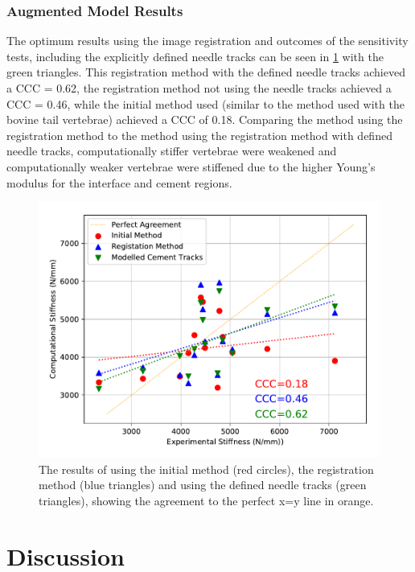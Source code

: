 \subsubsection{Augmented Model Results}\label{sec:augcompres}

The optimum results using the image registration and outcomes of the
sensitivity tests, including the explicitly defined needle tracks can be seen
in \cref{fig:aug_init_vs_best} with the green triangles.  This registration
method with the defined needle tracks achieved a CCC = 0.62, the registration
method not using the needle tracks achieved a CCC = 0.46, while the initial
method used (similar to the method used with the bovine tail vertebrae)
achieved a CCC of 0.18. Comparing the method using the registration method to
the method using the registration method with defined needle tracks,
computationally stiffer vertebrae were weakened and computationally weaker
vertebrae were stiffened due to the higher Young's modulus for the interface
and cement regions.

\begin{figure}[h!]
  \centering
	\includegraphics[width=\textwidth]{Chapters/Chapter_HT_images/aug_init_vs_best_vs_ndl_trcks}
	\caption{The results of using the initial method (red circles), the
registration method (blue triangles) and using the defined needle tracks (green
triangles), showing the agreement to the perfect x=y line in orange.}
	\label{fig:aug_init_vs_best}
\end{figure}


\section{Discussion}

